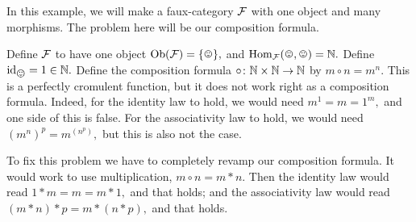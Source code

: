 \documentclass[../main/CT4S-EN-RU]{subfiles}
\begin{document}
\begin{exampleENG}
In this example, we will make a faux-category $\mathcal{F}$ with one object and many morphisms. The problem here will be our composition formula. 

Define $\mathcal{F}$ to have one object $\Ob(\mcF)=\singleton,$ and $\Hom_\mcF(\smiley,\smiley)=\NN.$ Define $\id_{\smiley}=1\in\NN.$ Define the composition formula $\circ\colon{\mathbb N}\times{\mathbb N}\rightarrow{\mathbb N}$ by $m\circ n=m^n.$ This is a perfectly cromulent function, but it does not work right as a composition formula. Indeed, for the identity law to hold, we would need $m^1=m=1^m,$ and one side of this is false. For the associativity law to hold, we would need $(m^n)^p=m^{(n^p)},$ but this is also not the case.

To fix this problem we have to completely revamp our composition formula. It would work to use multiplication, $m\circ n=m*n.$ Then the identity law would read $1*m=m=m*1,$ and that holds; and the associativity law would read $(m*n)*p=m*(n*p),$ and that holds.
\end{exampleENG}

\begin{exampleRUS}
\end{exampleRUS}
\end{document}
